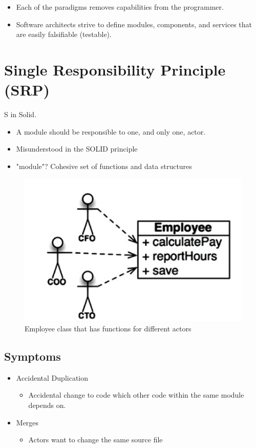 \documentclass[../Main.tex]{subfiles}
\begin{document}
\begin{itemize}
    \item Each of the paradigms removes capabilities from the programmer.
    \item Software architects strive to define modules, components, and services that are easily falsifiable (testable).
\end{itemize}

\section{Single Responsibility Principle (SRP)}
S in Solid.
\begin{itemize}
    \item A module should be responsible to	one, and only one, actor.
    \item Misunderstood in the SOLID principle
    \item "module"?	Cohesive set of functions and data structures
\end{itemize}

\begin{figure}[H]
    \centering
    \includegraphics[width=0.75\linewidth]{Images/cleanarch/employee.png}
    \caption{Employee class that has functions for different actors}
\end{figure}

\subsection{Symptoms}
\begin{itemize}
    \item Accidental Duplication
          \begin{itemize}
              \item Accidental change to code which other code within the same module depends on.
          \end{itemize}
    \item Merges
          \begin{itemize}
              \item Actors want to change the same source file
          \end{itemize}
\end{itemize}
\end{document}
